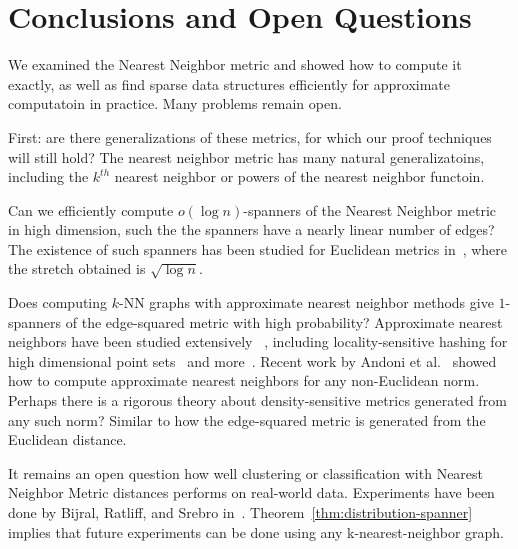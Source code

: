 \section{Conclusions and Open Questions}\label{sec:conclusions}


We examined the Nearest Neighbor metric and showed how to compute it
exactly, as well as find sparse data structures efficiently for approximate
computatoin in practice.  Many problems remain open.

First: are there generalizations of these metrics, for which our proof techniques
will still hold? The nearest neighbor metric has many natural
generalizatoins, including the $k^{th}$ nearest neighbor or powers of the
nearest neighbor functoin.

Can we efficiently compute $o(\log n)$-spanners of the Nearest Neighbor
metric in high dimension, such the the spanners have a nearly linear number of edges?
The existence of such spanners has been studied for Euclidean metrics in~\cite{HarPeled13}, where the stretch
obtained is $\sqrt{\log n}$.

Does computing $k$-NN graphs with approximate nearest neighbor methods give $1$-spanners of the
edge-squared metric with high probability?
Approximate nearest neighbors have been studied extensively
~\cite{kNNsurvey, Chen11, Dong11}, including locality-sensitive
hashing for high dimensional point sets~\cite{LSH} and
more~\cite{Laarhoven2018}.
Recent work by Andoni et al.~\cite{Andoni2018} showed how to compute
approximate nearest neighbors for any non-Euclidean norm.  Perhaps there
is a rigorous theory about density-sensitive metrics generated from any such
norm? Similar to
how the edge-squared metric is generated from the Euclidean distance.

It remains an open question how well clustering or
classification with
Nearest Neighbor Metric distances performs on real-world
data.
Experiments have been done by Bijral, Ratliff, and
Srebro in~\cite{bijral11semiSupLearningDBD}.
Theorem~\ref{thm:distribution-spanner} implies that future experiments
can be done using any
k-nearest-neighbor graph.


